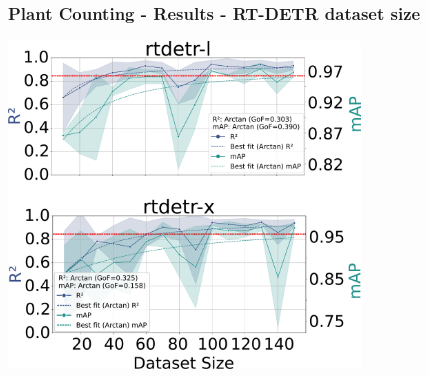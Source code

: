 \documentclass[aspectratio=43]{beamer}
\begin{document}
\begin{frame}
    \frametitle{Plant Counting - Results - RT-DETR dataset size}
    \begin{center}
        \includegraphics[width=0.7\textwidth]{Imgs/r2_ap_vs_dataset_size_rtdetr_3.pdf}
    \end{center}
\end{frame}

\end{document}
